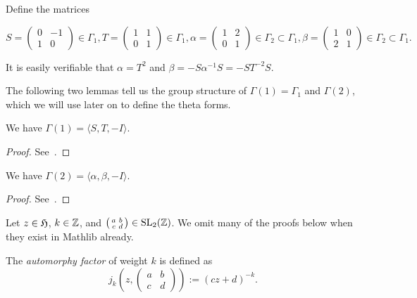 \begin{definition}\label{def:Gamma-generators}\leanok
  Define the matrices

  \[
    S = \begin{pmatrix} 0 & -1 \\ 1 & 0 \end{pmatrix} \in \Gamma_1,
    T = \begin{pmatrix} 1 & 1 \\ 0 & 1 \end{pmatrix} \in \Gamma_1,
    \alpha = \begin{pmatrix} 1 & 2 \\ 0 & 1 \end{pmatrix} \in \Gamma_2 \subset \Gamma_1,
    \beta = \begin{pmatrix} 1 & 0 \\ 2 & 1 \end{pmatrix} \in \Gamma_2 \subset \Gamma_1.
  \]

  It is easily verifiable that $\alpha = T^2$ and $\beta = -S\alpha^{-1}S = -ST^{-2}S$.
\end{definition}

The following two lemmas tell us the group structure of $\Gamma(1) = \Gamma_1$ and $\Gamma(2)$, which we will use later on to define the theta forms.

\begin{lemma}\label{lemma:Gamma-1-generators}\leanok
  We have $\Gamma(1) = \langle S, T, -I \rangle$.
\end{lemma}
\begin{proof}
    \leanok
  See~\cite[Exercise 1.1.1]{first course}.
\end{proof}

\begin{lemma}\label{lemma:Gamma-2-generators}\leanok
  We have $\Gamma(2) = \langle \alpha, \beta, -I \rangle$.
\end{lemma}
\begin{proof}
    \leanok
    See~\cite[Exercise 1.2.4]{first course}.
\end{proof}

Let $z\in\mathfrak{H}$, $k\in\mathbb{Z}$, and $\left(\begin{smallmatrix}a&b\\c&d\end{smallmatrix}\right)\in\mathrm{SL}_2(\mathbb{Z})$. We omit many of the proofs below when they exist in Mathlib already.
\begin{definition}\label{def:automorphy-factor}\leanok {}
    The \emph{automorphy factor} of weight $k$ is defined as
$$j_k(z,\left(\begin{smallmatrix}a&b\\c&d\end{smallmatrix}\right)):=(cz+d)^{-k}.$$
\end{definition}

